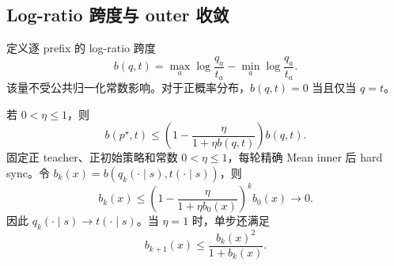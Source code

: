 \subsection{Log-ratio 跨度与 outer 收敛}

定义逐 prefix 的 log-ratio 跨度
\begin{equation}
 b(q,t)=\max_a\log\frac{q_a}{t_a}
        -\min_a\log\frac{q_a}{t_a}.
 \label{dyn:eq:mean-opd-span}
\end{equation}
该量不受公共归一化常数影响。对于正概率分布，$b(q,t)=0$ 当且仅当 $q=t$。

\begin{theorem}
\label{dyn:thm:mean-opd-span-convergence}
若 $0<\eta\le1$，则
\begin{equation}
 b(p^\star,t)
 \le\left(1-\frac{\eta}{1+\eta b(q,t)}\right)b(q,t).
 \label{dyn:eq:mean-opd-span-step}
\end{equation}
固定正 teacher、正初始策略和常数 $0<\eta\le1$，每轮精确 Mean inner 后 hard sync。令 $b_k(x)=b(q_k(\cdot\mid s),t(\cdot\mid s))$，则
\begin{equation}
 b_k(x)\le
 \left(1-\frac{\eta}{1+\eta b_0(x)}\right)^k b_0(x)
 \longrightarrow0.
 \label{dyn:eq:mean-opd-span-geometric}
\end{equation}
因此 $q_k(\cdot\mid s)\to t(\cdot\mid s)$。当 $\eta=1$ 时，单步还满足
\begin{equation}
 b_{k+1}(x)\le\frac{b_k(x)^2}{1+b_k(x)}.
 \label{dyn:eq:mean-opd-span-quadratic}
\end{equation}
\end{theorem}

